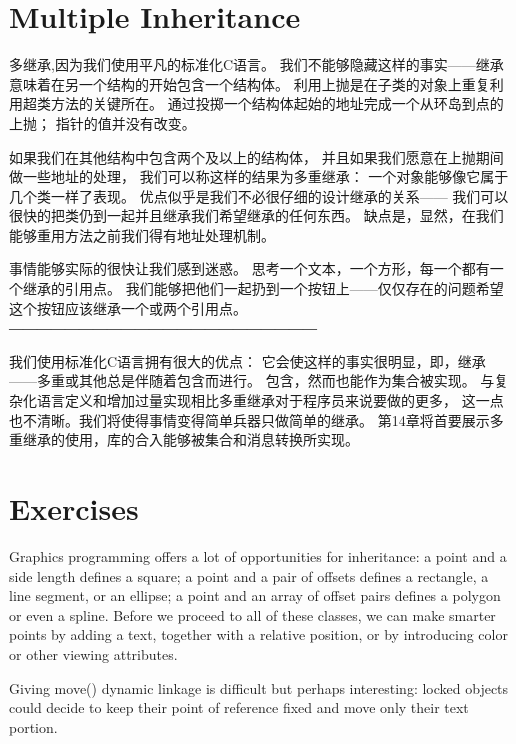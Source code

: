 \section{Multiple Inheritance}
多继承,因为我们使用平凡的标准化C语言。
我们不能够隐藏这样的事实——继承意味着在另一个结构的开始包含一个结构体。
利用上抛是在子类的对象上重复利用超类方法的关键所在。
通过投掷一个结构体起始的地址完成一个从环岛到点的上抛；
指针的值并没有改变。

如果我们在其他结构中包含两个及以上的结构体，
并且如果我们愿意在上抛期间做一些地址的处理，
我们可以称这样的结果为多重继承：
一个对象能够像它属于几个类一样了表现。
优点似乎是我们不必很仔细的设计继承的关系——
我们可以很快的把类仍到一起并且继承我们希望继承的任何东西。
缺点是，显然，在我们能够重用方法之前我们得有地址处理机制。

事情能够实际的很快让我们感到迷惑。
思考一个文本，一个方形，每一个都有一个继承的引用点。
我们能够把他们一起扔到一个按钮上——仅仅存在的问题希望这个按钮应该继承一个或两个引用点。
――――――――――――――――――――――

我们使用标准化C语言拥有很大的优点：
它会使这样的事实很明显，即，继承——多重或其他总是伴随着包含而进行。
包含，然而也能作为集合被实现。
与复杂化语言定义和增加过量实现相比多重继承对于程序员来说要做的更多，
这一点也不清晰。我们将使得事情变得简单兵器只做简单的继承。
第14章将首要展示多重继承的使用，库的合入能够被集合和消息转换所实现。

\section{Exercises}
Graphics programming offers a lot of opportunities for inheritance: 
a point and a side length defines a square; 
a point and a pair of offsets defines a rectangle, 
a line segment, or an ellipse; 
a point and an array of offset pairs defines a polygon or even a spline. 
Before we proceed to all of these classes, 
we can make smarter points by adding a text, 
together with a relative position, 
or by introducing color or other viewing attributes. 

Giving move() dynamic linkage is difficult but perhaps interesting: 
locked objects could decide to keep their point of reference fixed and 
move only their text portion. 

